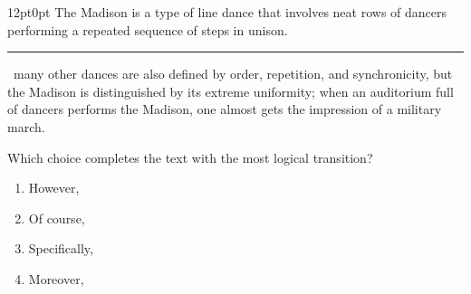 \documentclass[11pt, twocolumn]{article}
\newcounter{questionnum}
\begin{document}
\vspace{6pt}\noindent
\begin{minipage}{\columnwidth}\raggedright
\noindent{}\par\vspace{8pt}
\begin{adjustwidth}{12pt}{0pt}
The Madison is a type of line dance that involves neat rows of dancers performing a repeated sequence of steps in unison. \,\rule{2cm}{0.4pt}\, many other dances are also defined by order, repetition, and synchronicity, but the Madison is distinguished by its extreme uniformity; when an auditorium full of dancers performs the Madison, one almost gets the impression of a military march.
\vspace{6pt}

Which choice completes the text with the most logical transition?
\begin{enumerate}[label=\Alph*),leftmargin=18pt,topsep=3pt,itemsep=2pt]
  \item However,
  \item Of course,
  \item Specifically,
  \item Moreover,
\end{enumerate}
\end{adjustwidth}
\end{minipage}\par
\end{document}
